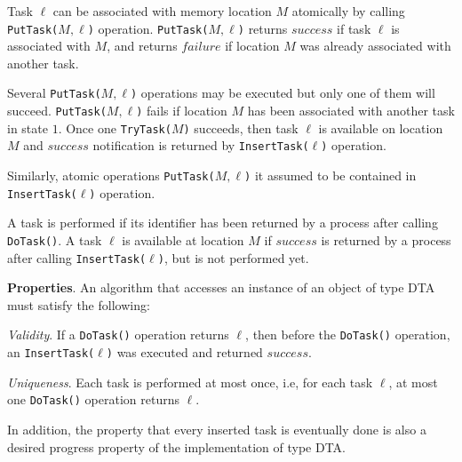 Task $\ell$ can be
associated with memory location $M$ atomically by calling \texttt{PutTask(}$M,\ell$\texttt{)} operation.
\texttt{PutTask(}$M,\ell$\texttt{)} returns $success$ if task $\ell$ is associated with $M$,
and returns $failure$ if location $M$ was already associated with another task.

Several \texttt{PutTask(}$M,\ell$\texttt{)} operations may be executed but only one of them will succeed.
\texttt{PutTask(}$M,\ell$\texttt{)} fails if location $M$ has been associated with another task in state $1$.
Once one \texttt{TryTask(}$M$\texttt{)} succeeds, then task $\ell$ is available on location $M$ and $success$
notification is returned by \texttt{InsertTask(}$\ell$\texttt{)} operation.

Similarly, atomic operations \texttt{PutTask(}$M,\ell$\texttt{)} it assumed to be contained in \texttt{InsertTask(}$\ell$\texttt{)}
operation.

A task is performed if its identifier has been returned by a process after calling \texttt{DoTask()}.
A task $\ell$ is available at location $M$ if $success$ is returned by a process
after calling \texttt{InsertTask(}$\ell$\texttt{)}, but is not performed yet.

\textbf{Properties}.
An algorithm that accesses an instance of an object of type DTA must satisfy the following:

\emph{Validity}. If a \texttt{DoTask()} operation returns $\ell$, then before the
\texttt{DoTask()} operation, an \texttt{InsertTask(}$\ell$\texttt{)} was executed and returned $success$.

\emph{Uniqueness}. Each task is performed at most once, i.e, for each task $\ell$, at most one \texttt{DoTask()}
operation returns $\ell$.

In addition, the property that every inserted task is eventually done is also a desired progress property
of the implementation of type DTA.
